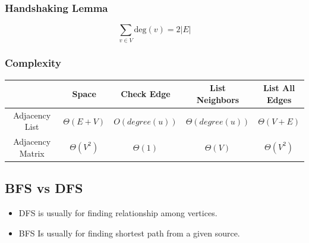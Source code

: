 \documentclass{article}
\begin{document}
\begin{multicols*}{2}
    \subsubsection*{Handshaking Lemma}
    \begin{equation*}
        \sum_{v \in V} \text{deg}(v) = 2|E|
    \end{equation*}

    \subsubsection*{Complexity}
    \begin{tabular}{ccccc}
                         & Space             & Check Edge       & \makecell{List                            \\Neighbors}        & \makecell{List All\\Edges}    \\
        \hline
        Adjacency List   & \(\Theta(E + V)\) & \(O(degree(u))\) & \(\Theta(degree(u))\) & \(\Theta(V + E)\) \\
        Adjacency Matrix & \(\Theta(V^2)\)   & \(\Theta(1)\)    & \(\Theta(V)\)         & \(\Theta(V^2)\)
    \end{tabular}

    \subsection*{BFS vs DFS}
    \begin{itemize}
        \item DFS is usually for finding relationship among vertices.
        \item BFS Is usually for finding shortest path from a given source.
    \end{itemize}


\end{multicols*}
\end{document}
